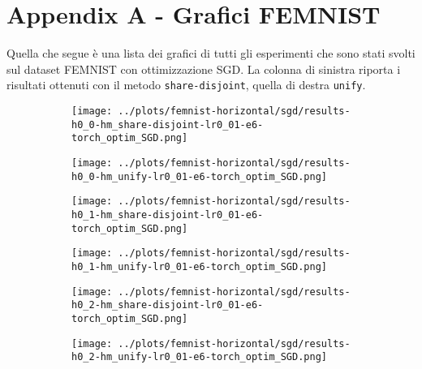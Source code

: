 \appendix

\chapter{Appendix A - Grafici FEMNIST}
Quella che segue è una lista dei grafici di tutti gli esperimenti
che sono stati svolti sul dataset FEMNIST con ottimizzazione SGD.
La colonna di sinistra 
riporta i risultati ottenuti con il metodo \texttt{share-disjoint}, 
quella di destra \texttt{unify}.
\begin{figure}[htbp]  %
    \centering
    \begin{subfigure}[b]{0.47\textwidth}
        \centering
        \texttt{[image: ../plots/femnist-horizontal/sgd/results-h0\_0-hm\_share-disjoint-lr0\_01-e6-torch\_optim\_SGD.png]}
    \end{subfigure}
    \hfill
    \begin{subfigure}[b]{0.47\textwidth}
        \centering
        \texttt{[image: ../plots/femnist-horizontal/sgd/results-h0\_0-hm\_unify-lr0\_01-e6-torch\_optim\_SGD.png]}
    \end{subfigure}
\end{figure}
\begin{figure}[htbp]  %
    \centering
    \begin{subfigure}[b]{0.47\textwidth}
        \centering
        \texttt{[image: ../plots/femnist-horizontal/sgd/results-h0\_1-hm\_share-disjoint-lr0\_01-e6-torch\_optim\_SGD.png]}
    \end{subfigure}
    \hfill
    \begin{subfigure}[b]{0.47\textwidth}
        \centering
        \texttt{[image: ../plots/femnist-horizontal/sgd/results-h0\_1-hm\_unify-lr0\_01-e6-torch\_optim\_SGD.png]}
    \end{subfigure}
\end{figure}
\begin{figure}[htbp]  %
    \centering
    \begin{subfigure}[b]{0.47\textwidth}
        \centering
        \texttt{[image: ../plots/femnist-horizontal/sgd/results-h0\_2-hm\_share-disjoint-lr0\_01-e6-torch\_optim\_SGD.png]}
    \end{subfigure}
    \hfill
    \begin{subfigure}[b]{0.47\textwidth}
        \centering
        \texttt{[image: ../plots/femnist-horizontal/sgd/results-h0\_2-hm\_unify-lr0\_01-e6-torch\_optim\_SGD.png]}
    \end{subfigure}
\end{figure}
